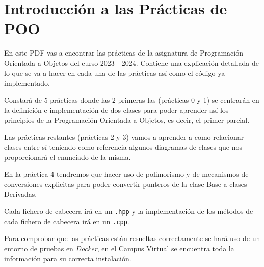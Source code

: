 \thispagestyle{empty}
\chapter*{Introducción a las Prácticas de POO}

En este PDF vas a encontrar las prácticas de la asignatura de Programación Orientada a Objetos
del curso 2023 - 2024.
Contiene una explicación detallada de lo que se va a hacer en cada una de las prácticas así
como el código ya implementado.

Constará de 5 prácticas donde las 2 primeras las (prácticas 0 y 1) se centrarán
en la definición e implementación de dos clases para poder aprender así los 
principios de la Programación Orientada a Objetos, es decir, el primer parcial.

Las prácticas restantes (prácticas 2 y 3) vamos a aprender a como relacionar clases
entre sí teniendo como referencia algunos diagramas de clases que nos proporcionará
el enunciado de la misma.

En la práctica 4 tendremos que hacer uso de polimorismo y de mecanismos de conversiones explicitas para poder convertir punteros de la clase Base a clases Derivadas.

Cada fichero de cabecera irá en un \texttt{.hpp} y la implementación de los métodos de 
cada fichero de cabecera irá en un \texttt{.cpp}.

Para comprobar que las prácticas están resueltas correctamente se hará uso de un
entorno de pruebas en \textit{Docker}, en el Campus Virtual se encuentra toda la información
para su correcta instalación.